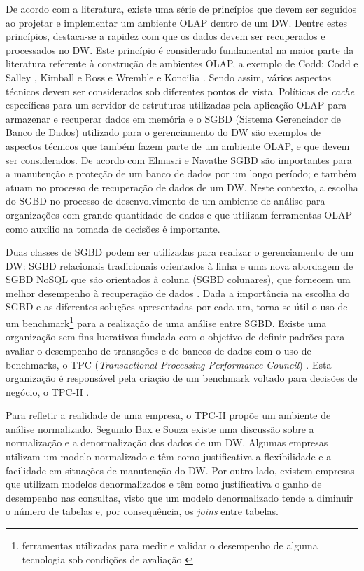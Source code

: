 De acordo com a literatura, existe uma série de princípios que devem ser seguidos ao projetar e implementar um ambiente OLAP dentro de um DW. 
Dentre estes princípios, destaca-se a rapidez com que os dados devem ser recuperados e processados no DW. Este princípio é considerado fundamental 
na maior parte da literatura referente à construção de ambientes OLAP, a exemplo de Codd; Codd e Salley \cite{codd1998providing}, Kimball e Ross \cite{kimball2002dw} 
e Wremble e Koncilia \cite{wrembel2007data}. Sendo assim, vários aspectos técnicos devem ser considerados sob diferentes pontos de vista. 
Políticas de \textit{cache} específicas para um servidor de estruturas utilizadas pela aplicação OLAP para armazenar e recuperar dados em memória 
e o SGBD (Sistema Gerenciador de Banco de Dados) utilizado para o gerenciamento do DW são exemplos de aspectos técnicos que também fazem parte de um ambiente OLAP, 
e que devem ser considerados. De acordo com Elmasri e Navathe \cite{navathe2011banco} SGBD são importantes para a manutenção 
e proteção de um banco de dados por um longo período; e também atuam no processo de recuperação de dados de um DW. Neste contexto, 
a escolha do SGBD no processo de desenvolvimento de um ambiente de análise para organizações com grande quantidade de dados e que utilizam ferramentas OLAP 
como auxílio na tomada de decisões é importante. 

Duas classes de SGBD podem ser utilizadas para realizar o gerenciamento de um DW: SGBD relacionais tradicionais orientados à linha e uma nova abordagem de SGBD 
NoSQL que são orientados à coluna (SGBD colunares), que fornecem um melhor desempenho à recuperação de dados \cite{good2017column}. 
Dada a importância na escolha do SGBD e as diferentes soluções apresentadas por cada um, torna-se útil o uso de um 
benchmark\footnote{ferramentas utilizadas para medir e validar o desempenho de alguma tecnologia sob condições de avaliação \cite{bouckaert2010benchmarking}} 
para a realização de uma análise entre SGBD. Existe uma organização sem fins lucrativos fundada com o objetivo de definir padrões para avaliar o 
desempenho de transações e de bancos de dados com o uso de benchmarks, o TPC (\textit{Transactional Processing Performance Council}) \cite{tpc2017page}. 
Esta organização é responsável pela criação de um benchmark voltado para decisões de negócio, o TPC-H \cite{tpch2017page}.

Para refletir a realidade de uma empresa, o TPC-H propõe um ambiente de análise normalizado. Segundo Bax e Souza \cite{bax2003modelagem} 
existe uma discussão sobre a normalização e a denormalização dos dados de um DW. Algumas empresas utilizam um modelo normalizado e têm como 
justificativa a flexibilidade e a facilidade em situações de manutenção do DW. Por outro lado, existem empresas que utilizam modelos denormalizados 
e têm como justificativa o ganho de desempenho nas consultas, visto que um modelo denormalizado tende a diminuir o número de tabelas e, por consequência, 
os \textit{joins} entre tabelas. 

